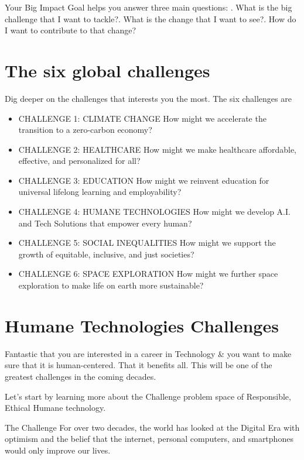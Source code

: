 \documentclass[11pt]{book} %
\begin{document}
Your Big Impact Goal helps you answer three main questions: . What is the big challenge that I want to tackle?. What is the change that I want to see?. How do I want to contribute to that change?

		\section{The six global challenges}
			Dig deeper on the challenges that interests you the most. The six challenges are
			\begin{itemize}
				\item CHALLENGE 1: CLIMATE CHANGE
				How might we accelerate the transition to a zero-carbon economy? 

				\item CHALLENGE 2: HEALTHCARE
				How might we make healthcare affordable, effective, and personalized for all? 
				
				\item CHALLENGE 3: EDUCATION
				How might we reinvent education for universal lifelong learning and employability? 
				
				\item CHALLENGE 4: HUMANE TECHNOLOGIES
				How might we develop A.I. and Tech Solutions that empower every human?
				
				\item CHALLENGE 5: SOCIAL INEQUALITIES
				How might we support the growth of equitable, inclusive, and just societies?
				
				\item CHALLENGE 6: SPACE EXPLORATION
				How might we further space exploration to make life on earth more sustainable? 
			\end{itemize}
	\section{Humane Technologies Challenges}
		Fantastic that you are interested in a career in Technology \& you want to make sure that it is human-centered. That it benefits all. This will be one of the greatest challenges in the coming decades. 
		
		Let's start by learning more about the Challenge problem space of Responsible, Ethical Humane technology.
		
		The Challenge
		For over two decades, the world has looked at the Digital Era with optimism and the belief that the internet, personal computers, and smartphones would only improve our lives. 
		
\end{document}
